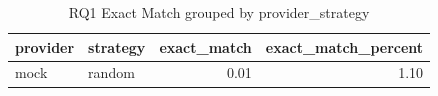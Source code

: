 \begin{table}
\caption{RQ1 Exact Match grouped by provider_strategy}
\label{tab:rq1_provider_strategy}
\begin{tabular}{llrr}
\toprule
provider & strategy & exact_match & exact_match_percent \\
\midrule
mock & random & 0.01 & 1.10 \\
\bottomrule
\end{tabular}
\end{table}
